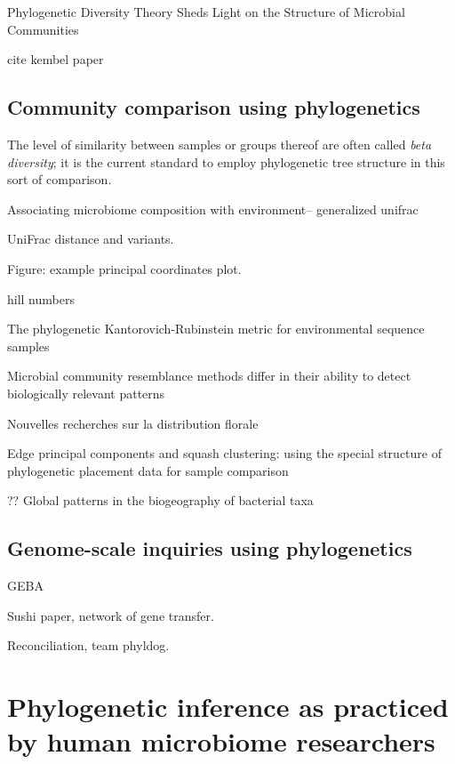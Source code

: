 \documentclass{amsart}
\begin{document}
\cite{odwyer2012phylogenetic}
Phylogenetic Diversity Theory Sheds Light on the Structure of Microbial Communities

cite kembel paper


\subsection{Community comparison using phylogenetics}

The level of similarity between samples or groups thereof are often called \emph{beta diversity}; it is the current standard to employ phylogenetic tree structure in this sort of comparison.

\cite{chen2012associating}
Associating microbiome composition with environment-- generalized unifrac

UniFrac distance and variants.
\cite{LozuponeKnightUniFrac05}
\cite{LozuponeEaWeightedUnifrac07}

Figure: example principal coordinates plot.

\cite{BikEaMicrobiotaStomach06}

hill numbers
\cite{chao2010phylogenetic}

\cite{evans2012phylogenetic}
The phylogenetic Kantorovich-Rubinstein metric for environmental sequence samples

\cite{kuczynski2010microbial}
Microbial community resemblance methods differ in their ability to detect biologically relevant patterns


\cite{jaccard1908nouvelles}
Nouvelles recherches sur la distribution florale


\cite{matsen2013edge}
Edge principal components and squash clustering: using the special structure of phylogenetic placement data for sample comparison

\cite{PurdomAnalyzingDataGraphs08}


\cite{nemergut2011global}
?? Global patterns in the biogeography of bacterial taxa


\subsection{Genome-scale inquiries using phylogenetics}

GEBA \cite{wu2009phylogeny}

Sushi paper, network of gene transfer.

Reconciliation, team phyldog.


\section{Phylogenetic inference as practiced by human microbiome researchers}
\end{document}
